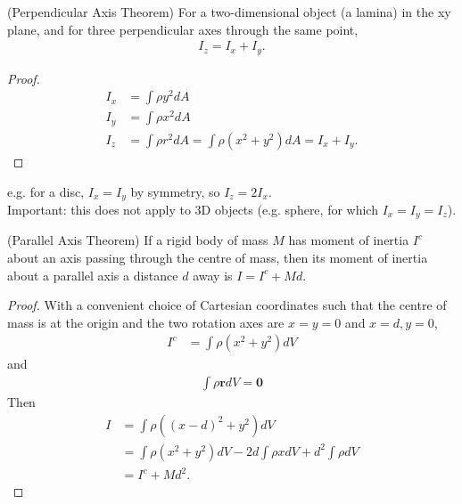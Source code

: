 \documentclass[a4paper]{article}
\begin{document}
\begin{thm}(Perpendicular Axis Theorem)
For a two-dimensional object (a lamina) in the xy plane, and for three perpendicular axes through the same point,
\begin{equation*}
\begin{aligned}
I_z=I_x+I_y.
\end{aligned}
\end{equation*}
\begin{proof}
\begin{equation*}
\begin{aligned}
I_x &= \int \rho y^2 dA\\
I_y &= \int \rho x^2 dA\\
I_z &= \int \rho r^2 dA = \int \rho \left(x^2+y^2\right)dA=I_x + I_y.
\end{aligned}
\end{equation*}
\end{proof}
e.g. for a disc, $I_x = I_y$ by symmetry, so $I_z = 2I_x$.\\
Important: this does not apply to 3D objects (e.g. sphere, for which $I_x=I_y=I_z$).
\end{thm}

\begin{thm}(Parallel Axis Theorem)
If a rigid body of mass $M$ has moment of inertia $I^c$ about an axis passing through the centre of mass, then its moment of inertia about a parallel axis a distance $d$ away is $I=I^c + Md$.
\begin{proof}
With a convenient choice of Cartesian coordinates such that the centre of mass is at the origin and the two rotation axes are $x=y=0$ and $x=d, y=0$,
\begin{equation*}
\begin{aligned}
I^c &= \int \rho\left(x^2+y^2\right) dV
\end{aligned}
\end{equation*}
and
\begin{equation*}
\begin{aligned}
\int \rho\mathbf{r} dV = \mathbf{0}
\end{aligned}
\end{equation*}
Then
\begin{equation*}
\begin{aligned}
I &= \int \rho\left(\left(x-d\right)^2+y^2\right)dV\\
&= \int \rho\left(x^2+y^2\right)dV - 2d\int \rho x dV + d^2 \int \rho dV\\
&= I^c + Md^2.
\end{aligned}
\end{equation*}
\end{proof}
\end{thm}
\end{document}
